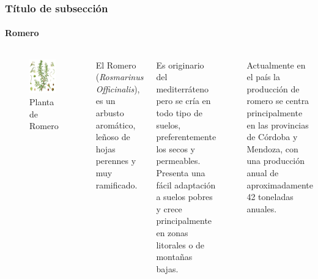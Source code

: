 \documentclass[aspectratio=1610]{beamer}
\newcommand{\ssec}{Título de subsección}
\begin{document}
\begin{frame}
	\frametitle{\ssec}
	\framesubtitle{Romero}
	\begin{columns}
		\begin{figure}
		\includegraphics[width=0.9\textwidth]{./figs/planta_romero.jpg}
		\caption{Planta de Romero}
		\end{figure}
		El Romero (\textit{Rosmarinus Officinalis}), 
		es un arbusto aromático, 
		leñoso de hojas perennes y muy ramificado.

		Es originario del mediterráteno pero se cría en todo tipo de suelos,
		preferentemente los secos y permeables. 
		Presenta una fácil adaptación a suelos pobres y crece principalmente en zonas litorales o de montañas bajas.

		~

		Actualmente en el país la producción de romero se centra principalmente en las provincias de Córdoba y Mendoza,
		con una producción anual de aproximadamente 42 toneladas anuales.
	\end{columns}
\end{frame}
\end{document}
